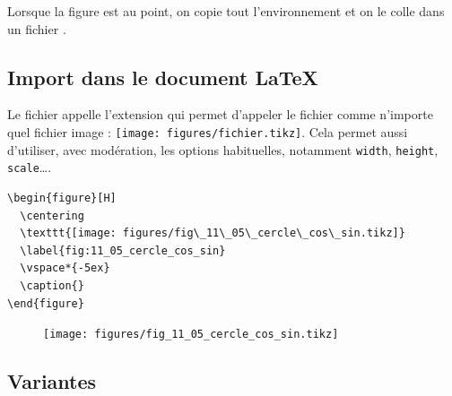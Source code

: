 Lorsque la figure est au point, on copie tout l'environnement  et on le colle dans un fichier .



\subsection{Import dans le document \LaTeX}


Le fichier  appelle l'extension  qui permet d'appeler le fichier  comme n'importe quel fichier image : \texttt{\texttt{[image: figures/fichier.tikz]}}. Cela permet aussi d'utiliser, avec modération, les options habituelles, notamment \texttt{width}, \texttt{height}, \texttt{scale}\dots.


\begin{minipage}[m]{.48\linewidth}
	\begin{verbatim}
\begin{figure}[H]
  \centering
  \texttt{[image: figures/fig\_11\_05\_cercle\_cos\_sin.tikz]}
  \label{fig:11_05_cercle_cos_sin}
  \vspace*{-5ex}
  \caption{}
\end{figure}
	\end{verbatim}
\end{minipage}
\hfill
\begin{minipage}[m]{.48\linewidth}
	\begin{figure}[H]
		\centering
		\texttt{[image: figures/fig\_11\_05\_cercle\_cos\_sin.tikz]}
		\label{fig:11_05_cercle_cos_sin}
		\vspace*{-5ex}
		\caption{}
	\end{figure}
\end{minipage}



\subsection{Variantes}
\label{sec:variantesExportGeoGebra}

